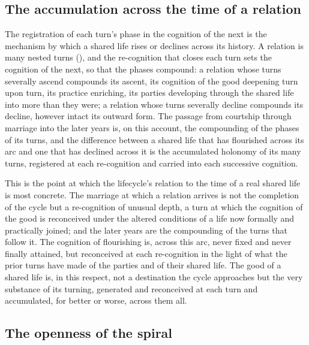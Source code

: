 \subsection{The accumulation across the time of a relation}
\label{p11:sec:rec-accumulation}

The registration of each turn's phase in the cognition of the next is the mechanism by which a shared life rises or declines across its history. A relation is many nested turns (), and the re-cognition that closes each turn sets the cognition of the next, so that the phases compound: a relation whose turns severally ascend compounds its ascent, its cognition of the good deepening turn upon turn, its practice enriching, its parties developing through the shared life into more than they were; a relation whose turns severally decline compounds its decline, however intact its outward form. The passage from courtship through marriage into the later years is, on this account, the compounding of the phases of its turns, and the difference between a shared life that has flourished across its arc and one that has declined across it is the accumulated holonomy of its many turns, registered at each re-cognition and carried into each successive cognition.

This is the point at which the lifecycle's relation to the time of a real shared life is most concrete. The marriage at which a relation arrives is not the completion of the cycle but a re-cognition of unusual depth, a turn at which the cognition of the good is reconceived under the altered conditions of a life now formally and practically joined; and the later years are the compounding of the turns that follow it. The cognition of flourishing is, across this arc, never fixed and never finally attained, but reconceived at each re-cognition in the light of what the prior turns have made of the parties and of their shared life. The good of a shared life is, in this respect, not a destination the cycle approaches but the very substance of its turning, generated and reconceived at each turn and accumulated, for better or worse, across them all.

\subsection{The openness of the spiral}
\label{p11:sec:rec-openness}

